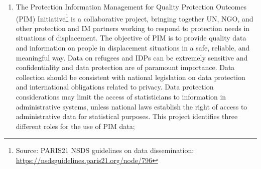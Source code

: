 \documentclass[
]{article}
\begin{document}
\begin{enumerate}
{  Datasets in Disaster Preparedness and
  Response}.
\item
  The Protection Information Management for Quality Protection
  Outcomes (PIM) Initiative\footnote{Source: PARIS21 NSDS guidelines on data dissemination:
    \url{https://nsdsguidelines.paris21.org/node/796}} is a collaborative project, bringing
  together UN, NGO, and other protection and IM partners working to
  respond to protection needs in situations of displacement. The
  objective of PIM is to provide quality data and information on
  people in displacement situations in a safe, reliable, and
  meaningful way. Data on refugees and IDPs can be extremely sensitive
  and confidentiality and data protection are of paramount importance.
  Data collection should be consistent with national legislation on
  data protection and international obligations related to privacy.
  Data protection considerations may limit the access of statisticians
  to information in administrative systems, unless national laws
  establish the right of access to administrative data for statistical
  purposes. This project identifies three different roles for the use
  of PIM data;


\end{enumerate}
\end{document}
